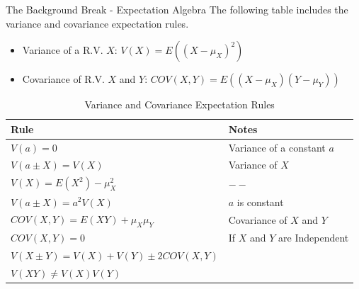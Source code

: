 
\begin{frame}{The Background Break - Expectation Algebra}
        The following table includes the variance and covariance expectation rules.
        \begin{itemize}
            \item Variance of a R.V. $X$: $V(X) = E\left((X-\mu_X)^2\right)$
            \item Covariance of R.V. $X$ and $Y$: $COV(X,Y) = E\left((X-\mu_X)(Y-\mu_Y)\right)$
        \end{itemize}
         \begin{table}[]
            \centering
            \begin{tabular}{ll}
                \toprule
                \textbf{Rule} & \textbf{Notes} \\
                \toprule
                $V(a) = 0$ & Variance of a constant $a$\\[0.7em]
                $V(a\pm X) = V(X)$ & Variance of $X$\\[0.7em]
                $V(X) = E(X^2) - \mu_X^2$ & $--$\\[0.7em]
                $V(a\pm X) = a^2 V(X)$ & $a$ is constant\\[0.7em]
                $COV(X,Y) =E(XY) + \mu_X \mu_Y$ & Covariance of $X$ and $Y$\\[0.7em]
                $COV(X,Y) = 0$ & If $X$ and $Y$ are Independent\\[0.7em]
                $V(X\pm Y) = V(X) + V(Y) \pm 2COV(X,Y)$ & \\[0.7em]
                $V(XY) \neq V(X) V(Y)$ & \\[0.7em]
                \bottomrule
            \end{tabular}
            \caption{Variance and Covariance Expectation Rules}
            \label{tab:Var_CoVar_Rules}
        \end{table}
\end{frame}

